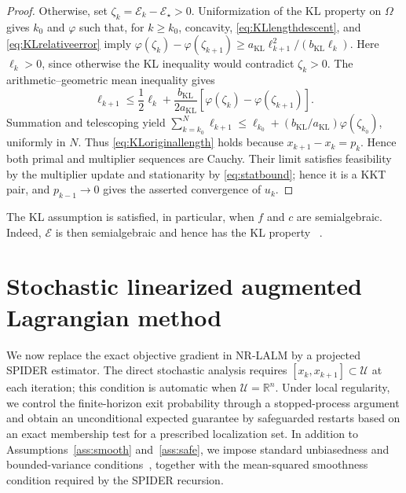 \documentclass[11pt]{article}
\theoremstyle{definition}
\theoremstyle{remark}
\numberwithin{equation}{section}
\numberwithin{figure}{section}
\numberwithin{table}{section}
\numberwithin{algorithm}{section}
\newcommand{\R}{\mathbb{R}}
\begin{document}
\begin{proof}
Otherwise, set
\(\zeta_k=\mathcal E_k-\mathcal E_\star>0\).  Uniformization of the KL
property on \(\Omega\) gives \(k_0\) and \(\varphi\) such that, for
\(k\ge k_0\), concavity, \eqref{eq:KLlengthdescent}, and
\eqref{eq:KLrelativeerror} imply
\(\varphi(\zeta_k)-\varphi(\zeta_{k+1})
\ge a_{\mathrm{KL}}\ell_{k+1}^2/(b_{\mathrm{KL}}\ell_k)\).
Here \(\ell_k>0\), since otherwise the KL inequality would contradict
\(\zeta_k>0\).  The arithmetic--geometric mean inequality gives
\begin{equation}
 \ell_{k+1}\le\frac12\ell_k+
 \frac{b_{\mathrm{KL}}}{2a_{\mathrm{KL}}}
 [\varphi(\zeta_k)-\varphi(\zeta_{k+1})].
 \label{eq:KLrecursion}
\end{equation}
Summation and telescoping yield
\(\sum_{k=k_0}^{N}\ell_{k+1}\le
\ell_{k_0}+(b_{\mathrm{KL}}/a_{\mathrm{KL}})
\varphi(\zeta_{k_0})\), uniformly in \(N\).  Thus
\eqref{eq:KLoriginallength} holds because \(x_{k+1}-x_k=p_k\).  Hence
both primal and multiplier sequences are Cauchy.  Their limit satisfies
feasibility by the multiplier update and stationarity by
\eqref{eq:statbound}; hence it is a KKT pair, and
\(p_{k-1}\to0\) gives the asserted convergence of \(u_k\).
\end{proof}

The KL assumption is satisfied, in particular, when $f$ and $c$ are
semialgebraic.  Indeed, $\mathcal E$ is then semialgebraic and hence has the KL property ~\cite{BolteDaniilidisLewis2007,AttouchBolteSvaiter2013}.

\section{Stochastic linearized augmented Lagrangian method}
\label{sec:stochastic}

We now replace the exact objective gradient in NR-LALM by a projected SPIDER estimator.  The direct stochastic analysis requires $[x_k,x_{k+1}]\subset\mathcal U$ at each iteration; this condition is automatic when $\mathcal U=\R^n$.  Under local regularity, we control the finite-horizon exit probability through a stopped-process argument and obtain an unconditional expected guarantee by safeguarded restarts based on an exact membership test for a prescribed localization set.  In addition to
Assumptions~\ref{ass:smooth} and~\ref{ass:safe}, we impose standard
unbiasedness and bounded-variance conditions~\cite{GhadimiLan2013}, together with the mean-squared smoothness condition required by the SPIDER recursion.
\end{document}
